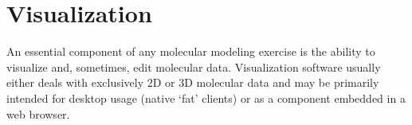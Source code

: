 \section{Visualization}
  
An essential component of any molecular modeling exercise is the ability to visualize and, sometimes, edit molecular data.  Visualization software usually either deals with exclusively 2D or 3D molecular data and may be primarily intended for desktop usage (native `fat' clients) or as a component embedded in a web browser.